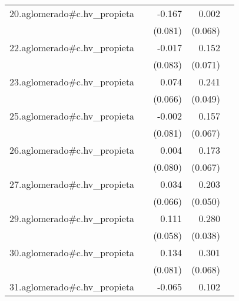 {\begin{longtable}{l*{4}{D{.}{.}{-1}}}
\addlinespace
20.aglomerado#c.hv\_propieta&                     &      -0.167\sym{*}  &       0.002         &                     \\
            &                     &     (0.081)         &     (0.068)         &                     \\
\addlinespace
22.aglomerado#c.hv\_propieta&                     &      -0.017         &       0.152\sym{*}  &                     \\
            &                     &     (0.083)         &     (0.071)         &                     \\
\addlinespace
23.aglomerado#c.hv\_propieta&                     &       0.074         &       0.241\sym{***}&                     \\
            &                     &     (0.066)         &     (0.049)         &                     \\
\addlinespace
25.aglomerado#c.hv\_propieta&                     &      -0.002         &       0.157\sym{*}  &                     \\
            &                     &     (0.081)         &     (0.067)         &                     \\
\addlinespace
26.aglomerado#c.hv\_propieta&                     &       0.004         &       0.173\sym{**} &                     \\
            &                     &     (0.080)         &     (0.067)         &                     \\
\addlinespace
27.aglomerado#c.hv\_propieta&                     &       0.034         &       0.203\sym{***}&                     \\
            &                     &     (0.066)         &     (0.050)         &                     \\
\addlinespace
29.aglomerado#c.hv\_propieta&                     &       0.111         &       0.280\sym{***}&                     \\
            &                     &     (0.058)         &     (0.038)         &                     \\
\addlinespace
30.aglomerado#c.hv\_propieta&                     &       0.134         &       0.301\sym{***}&                     \\
            &                     &     (0.081)         &     (0.068)         &                     \\
\addlinespace
31.aglomerado#c.hv\_propieta&                     &      -0.065         &       0.102         &                     \\

\end{longtable}}
